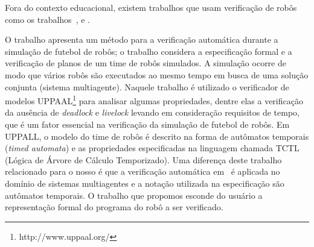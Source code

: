 Fora do contexto educacional, existem trabalhos que usam verificação de robôs como os trabalhos~\cite{silva}, \cite{SSS147734} e \cite{araujomotanogueira}.

O trabalho \cite{silva} apresenta um método para a verificação automática durante a simulação de futebol de robôs; o trabalho considera a especificação formal e a verificação de planos de um time de robôs simulados. A simulação ocorre de modo que vários robôs são executados ao mesmo tempo em busca de uma solução conjunta (sistema multiagente). Naquele trabalho é utilizado o verificador de modelos UPPAAL\footnote[9]{http://www.uppaal.org/} para analisar algumas propriedades, dentre elas a verificação da ausência de \textit{deadlock} e \textit{livelock} levando em consideração requisitos de tempo, que é um fator essencial na verificação da simulação de futebol de robôs. Em UPPALL, o modelo do time de robôs é descrito na forma de autômatos temporais (\textit{timed automata}) e as propriedades especificadas na linguagem chamada TCTL (Lógica de Árvore de Cálculo Temporizado). Uma diferença deste trabalho relacionado para o nosso é que a verificação automática em~\cite{silva} é aplicada no domínio de sistemas multiagentes e a notação utilizada na especificação são autômatos temporais. O trabalho que propomos esconde do usuário a representação formal do programa do robô a ser verificado.
	
